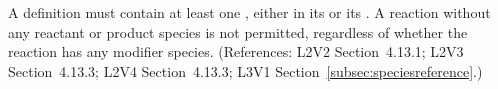 A \Reaction definition must contain at least one \SpeciesReference, either
in its  or its .  A reaction
without any reactant or product species is not permitted, regardless of
whether the reaction has any modifier species.  (References: L2V2
Section~4.13.1; L2V3 Section~4.13.3; L2V4 Section~4.13.3; L3V1 Section~\ref{subsec:speciesreference}.)
